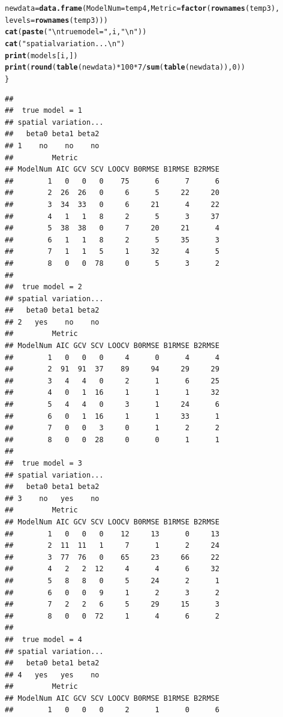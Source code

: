 \documentclass{article}\usepackage{graphicx, color}
\makeatletter
\newcommand{\hlfunctioncall}[1]{\textcolor[rgb]{0.501960784313725,0,0.329411764705882}{\textbf{#1}}}%
\newcommand{\hlstring}[1]{\textcolor[rgb]{0.6,0.6,1}{#1}}%
\newenvironment{kframe}{%
 \def\at@end@of@kframe{}%
 \ifinner\ifhmode%
  \def\at@end@of@kframe{\end{minipage}}%
  \begin{minipage}{\columnwidth}%
 \fi\fi%
 \def\FrameCommand##1{\hskip\@totalleftmargin \hskip-\fboxsep
 \colorbox{shadecolor}{##1}\hskip-\fboxsep
     \hskip-\linewidth \hskip-\@totalleftmargin \hskip\columnwidth}%
 \MakeFramed {\advance\hsize-\width
   \@totalleftmargin\z@ \linewidth\hsize
   \@setminipage}}%
 {\par\unskip\endMakeFramed%
 \at@end@of@kframe}
\newenvironment{knitrout}{}{} %
\makeatother
\begin{document}
\begin{knitrout}
\begin{kframe}
\begin{alltt}
    newdata = \hlfunctioncall{data.frame}(ModelNum = temp4, Metric = \hlfunctioncall{factor}(\hlfunctioncall{rownames}(temp3), 
        levels = \hlfunctioncall{rownames}(temp3)))
    \hlfunctioncall{cat}(\hlfunctioncall{paste}(\hlstring{"\textbackslash{}n true model ="}, i, \hlstring{"\textbackslash{}n"}))
    \hlfunctioncall{cat}(\hlstring{"spatial variation...\textbackslash{}n"})
    \hlfunctioncall{print}(models[i, ])
    \hlfunctioncall{print}(\hlfunctioncall{round}(\hlfunctioncall{table}(newdata) * 100 * 7/\hlfunctioncall{sum}(\hlfunctioncall{table}(newdata)), 0))
\}
\end{alltt}
\begin{verbatim}
## 
##  true model = 1 
## spatial variation...
##   beta0 beta1 beta2
## 1    no    no    no
##         Metric
## ModelNum AIC GCV SCV LOOCV B0RMSE B1RMSE B2RMSE
##        1   0   0   0    75      6      7      6
##        2  26  26   0     6      5     22     20
##        3  34  33   0     6     21      4     22
##        4   1   1   8     2      5      3     37
##        5  38  38   0     7     20     21      4
##        6   1   1   8     2      5     35      3
##        7   1   1   5     1     32      4      5
##        8   0   0  78     0      5      3      2
## 
##  true model = 2 
## spatial variation...
##   beta0 beta1 beta2
## 2   yes    no    no
##         Metric
## ModelNum AIC GCV SCV LOOCV B0RMSE B1RMSE B2RMSE
##        1   0   0   0     4      0      4      4
##        2  91  91  37    89     94     29     29
##        3   4   4   0     2      1      6     25
##        4   0   1  16     1      1      1     32
##        5   4   4   0     3      1     24      6
##        6   0   1  16     1      1     33      1
##        7   0   0   3     0      1      2      2
##        8   0   0  28     0      0      1      1
## 
##  true model = 3 
## spatial variation...
##   beta0 beta1 beta2
## 3    no   yes    no
##         Metric
## ModelNum AIC GCV SCV LOOCV B0RMSE B1RMSE B2RMSE
##        1   0   0   0    12     13      0     13
##        2  11  11   1     7      1      2     24
##        3  77  76   0    65     23     66     22
##        4   2   2  12     4      4      6     32
##        5   8   8   0     5     24      2      1
##        6   0   0   9     1      2      3      2
##        7   2   2   6     5     29     15      3
##        8   0   0  72     1      4      6      2
## 
##  true model = 4 
## spatial variation...
##   beta0 beta1 beta2
## 4   yes   yes    no
##         Metric
## ModelNum AIC GCV SCV LOOCV B0RMSE B1RMSE B2RMSE
##        1   0   0   0     2      1      0      6

\end{verbatim}
\end{kframe}
\end{knitrout}
\end{document}
